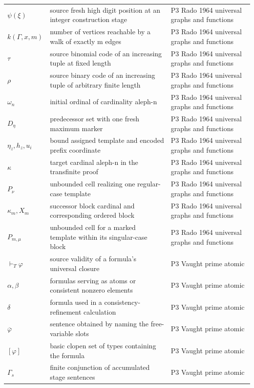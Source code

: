 \begin{longtable}{@{}p{}p{}p{}@{}}
\(\psi(\xi)\) & source fresh high digit position at an integer construction stage & P3 Rado 1964 universal graphs and functions \\
\(k(\Gamma,\allowbreak x,\allowbreak m)\) & number of vertices reachable by a walk of exactly m edges & P3 Rado 1964 universal graphs and functions \\
\(\tau\) & source binomial code of an increasing tuple at fixed length & P3 Rado 1964 universal graphs and functions \\
\(\rho\) & source binary code of an increasing tuple of arbitrary finite length & P3 Rado 1964 universal graphs and functions \\
\(\omega_n\) & initial ordinal of cardinality aleph-n & P3 Rado 1964 universal graphs and functions \\
\(D_\eta\) & predecessor set with one fresh maximum marker & P3 Rado 1964 universal graphs and functions \\
\(\eta_z,\allowbreak h_z,\allowbreak u_i\) & bound assigned template and encoded prefix coordinate & P3 Rado 1964 universal graphs and functions \\
\(\kappa\) & target cardinal aleph-n in the transfinite proof & P3 Rado 1964 universal graphs and functions \\
\(P_\nu\) & unbounded cell realizing one regular-case template & P3 Rado 1964 universal graphs and functions \\
\(\kappa_m,\allowbreak X_m\) & successor block cardinal and corresponding ordered block & P3 Rado 1964 universal graphs and functions \\
\(P_{m,\mu}\) & unbounded cell for a marked template within its singular-case block & P3 Rado 1964 universal graphs and functions \\
\(\vdash_T\varphi\) & source validity of a formula's universal closure & P3 Vaught prime atomic \\
\(\alpha,\allowbreak \beta\) & formulas serving as atoms or consistent nonzero elements & P3 Vaught prime atomic \\
\(\delta\) & formula used in a consistency-refinement calculation & P3 Vaught prime atomic \\
\(\overline\varphi\) & sentence obtained by naming the free-variable slots & P3 Vaught prime atomic \\
\([\varphi]\) & basic clopen set of types containing the formula & P3 Vaught prime atomic \\
\(\Gamma_s\) & finite conjunction of accumulated stage sentences & P3 Vaught prime atomic \\

\end{longtable}
